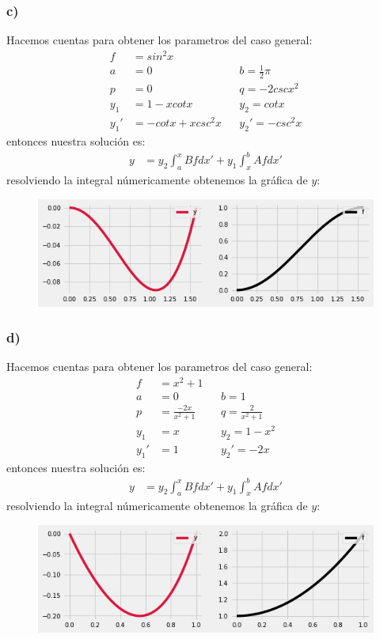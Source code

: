 \documentclass{article}
\begin{document}
\begin{tcolorbox}[breakable]
    \subsubsection*{c)}
    Hacemos cuentas para obtener los parametros del caso general:
    \begin{align*}
        f&= sin^2x \\
        a&=0 &&b=\frac{1}{2}\pi \\
        p&=0 &&q= -2cscx^2 \\
        y_1 &= 1-xcotx  &&y_2= cotx \\
        y_1' &= -cotx + xcsc^2x  &&y_2'= -csc^2x 
    \end{align*}
    entonces nuestra solución es:
    \begin{align*}
        y &=  y_2\int_{a}^x Bf dx' + y_1\int_{x}^b Afdx' 
    \end{align*}
    resolviendo la integral númericamente obtenemos la gráfica de $y$:
    \begin{figure}[H]
        \centering
        \includegraphics[scale=0.7]{images/p3_3.png}
    \end{figure}

    \subsubsection*{d)}
    Hacemos cuentas para obtener los parametros del caso general:
    \begin{align*}
        f&= x^2+1 \\
        a &=0 &&b=1 \\
        p &=\frac{-2x}{x^2+1} &&q= \frac{2}{x^2+1} \\
        y_1 &=x  &&y_2= 1-x^2 \\
        y_1' &=1 &&y_2'= -2x  
    \end{align*}
    entonces nuestra solución es:
    \begin{align*}
        y &=  y_2\int_{a}^x Bf dx' + y_1\int_{x}^b Afdx' 
    \end{align*}
    resolviendo la integral númericamente obtenemos la gráfica de $y$:
    \begin{figure}[H]
        \centering
        \includegraphics[scale=0.7]{images/p3_4.png}
    \end{figure}
\end{tcolorbox}
\newpage
\end{document}
